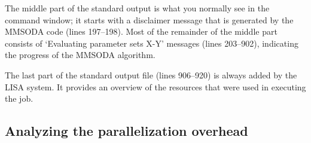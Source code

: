 The middle part of the standard output is what you normally see in the command window; it starts with a disclaimer message that is generated by the MMSODA code (lines 197--198). Most of the remainder of the middle part consists of `Evaluating parameter sets X-Y' messages (lines 203--902), indicating the progress of the MMSODA algorithm.

The last part of the standard output file (lines 906--920) is always added by the LISA system. It provides an overview of the resources that were used in executing the job.









\subsection{Analyzing the parallelization overhead}

